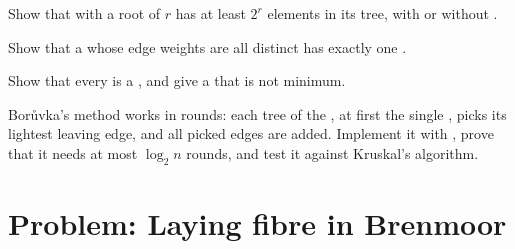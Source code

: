 \begin{exercise}[$\star\star$]\label{exo:b1:spanning-trees:9}
Show that with  a root of  $r$ has at least $2^r$ elements in its tree, with or without .
\end{exercise}

\begin{exercise}[$\star\star\star$]\label{exo:b1:spanning-trees:10}
Show that a  whose edge weights are all distinct has exactly one .
\end{exercise}

\begin{exercise}[$\star\star\star$]\label{exo:b1:spanning-trees:11}
Show that every  is a , and give a  that is not
minimum.
\end{exercise}

\begin{exercise}[$\star\star\star$]\label{exo:b1:spanning-trees:12}
Borůvka's method works in rounds: each tree of the , at first the single , picks its lightest leaving
edge, and all picked edges are added. Implement it with , prove that it needs at most $\log_2 n$ rounds,
and test it against Kruskal's algorithm.
\end{exercise}

\section{Problem: Laying fibre in Brenmoor}\label{sec:b1:spanning-trees:problem}

